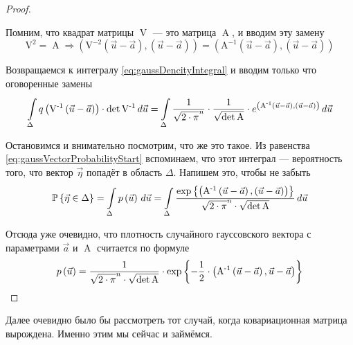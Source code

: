 \begin{proof}
\begin{enumerate}
            Помним, что квадрат матрицы $\operatorname{V}$ --- это матрица
            $\operatorname{A}$, и вводим эту замену
            $$\operatorname{V^2} = \operatorname{A} \Rightarrow
                \left( \operatorname{V^{-2}} \left( \vec{u} - \vec{a} \right),
                        \left( \vec{u} - \vec{a} \right) \right)
                = \left( \operatorname{A^{-1}} \left( \vec{u} - \vec{a} \right),
                        \left( \vec{u} - \vec{a} \right) \right)$$
    \end{enumerate}

    Возвращаемся к интегралу \eqref{eq:gaussDencityIntegral} и вводим
    только что оговоренные замены
    $$\integrall{\Delta}{d\vec{u}}{ q\left( \operatorname{V^{-1}}
                \left( \vec{u} - \vec{a} \right) \right)
            \cdot \det{\operatorname{V^{-1}}}}
        = \integrall{\Delta}{d\vec{u}}{\frac{1}{\sqrt{2 \cdot \pi}^n}
            \cdot \frac{1}{\sqrt{\det{\operatorname{A}}}}
            \cdot e^{\left( \operatorname{A^{-1}}
                    \left( \vec{u} - \vec{a} \right),
                \left( \vec{u} - \vec{a} \right) \right)}}$$

    Остановимся и внимательно посмотрим, что же это такое. Из равенства
    \eqref{eq:gaussVectorProbabilityStart} вспоминаем, что этот интеграл ---
    вероятность того, что вектор $\vec{\eta}$ попадёт в область $\Delta$.
    Напишем это, чтобы не забыть
    $$\Probability{\vec{\eta} \in \Delta}
        = \integrall{\Delta}{d\vec{u}}{\pdf{\vec{u}}}
        = \integrall{\Delta}{d\vec{u}}{
            \frac{\exp{\left\{\left( \operatorname{A^{-1}}
                    \left( \vec{u} - \vec{a} \right),
                \left( \vec{u} - \vec{a} \right) \right) \right\}}}{
                \sqrt{2 \cdot \pi}^n \cdot \sqrt{\det{\operatorname{A}}}}}$$

    Отсюда уже очевидно, что плотность случайного гауссовского вектора с
    параметрами $\vec{a}$ и $\operatorname{A}$ считается по формуле
    $$\pdf{\vec{u}}
        = \frac{1}{\sqrt{2 \cdot \pi}^n \cdot \sqrt{\det{\operatorname{A}}}}
            \cdot \exp{\left\{ -\frac{1}{2} \cdot \left(
                \operatorname{A^{-1}} \left( \vec{u} - \vec{a} \right),
                \vec{u} - \vec{a} \right) \right\}}$$
\end{proof}

Далее очевидно было бы рассмотреть тот случай, когда ковариационная матрица
вырождена. Именно этим мы сейчас и займёмся.

